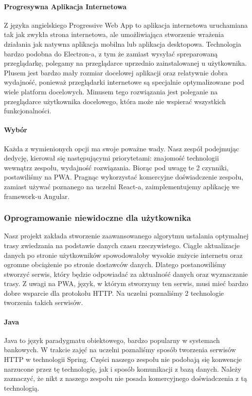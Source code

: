 \paragraph{Progresywna Aplikacja Internetowa}
Z języka angielskiego Progressive Web App to aplikacja internetowa uruchamiana tak jak zwykła strona internetowa, ale umożliwiająca stworzenie wrażenia działania jak natywna aplikacja mobilna lub aplikacja desktopowa.
Technologia bardzo podobna do Electron-a, z tym że zamiast wysyłać spreparowaną przeglądarkę, polegamy na przeglądarce uprzednio zainstalowanej u użytkownika.
Plusem jest bardzo mały rozmiar docelowej aplikacji oraz relatywnie dobra wydajność, ponieważ przeglądarki internetowe są specjalnie optymalizowane pod wiele platform docelowych.
Minusem tego rozwiązania jest poleganie na przeglądarce użytkownika docelowego, która może nie wspierać wszystkich funkcjonalności.

\paragraph{Wybór}
Każda z wymienionych opcji ma swoje poważne wady.
Nasz zespół podejmując dedycję, kierował się następującymi priorytetami: znajomość technologii wewnątrz zespołu, wydajność rozwiązania.
Biorąc pod uwagę te 2 czynniki, postawiliśmy na PWA\@.
Pragnąc wykorzystać komercyjne doświadczenie zespołu, zamiast używać poznanego na uczelni React-a, zaimplementujemy aplikację we framework-u Angular.

\subsubsection{Oprogramowanie niewidoczne dla użytkownika}
Nasz projekt zakłada stworzenie zaawansowanego algorytmu ustalania optymalnej trasy zwiedzania na podstawie danych czasu rzeczywistego.
Ciągłe aktualizacje danych po stronie użytkowników spowodowałoby wysokie zużycie internetu oraz ogromne obciążenie po stronie dostawców danych.
Dlatego postanowiliśmy stworzyć serwis, który będzie odpowiadać za aktualność danych oraz wyznaczanie trasy.
Z uwagi na PWA, język, w którym stworzymy ten serwis, musi mieć bardzo dobre wsparcie dla protokołu HTTP\@.
Na uczelni poznaliśmy 2 technologie tworzenia takich serwisów.

\paragraph{Java}
Java to język paradygmatu obiektowego, bardzo popularny w systemach bankowych.
W trakcie zajęć na uczelni poznaliśmy sposób tworzenia serwisów HTTP w technologii Spring.
Części naszego zespołu nie podobają się konwencje narzucone przez tę technologię, jak i sposób komunikacji z bazą danych.
Należy zaznaczyć, że nikt z naszego zespołu nie posada komercyjnego doświadczenia z tą technologią.

